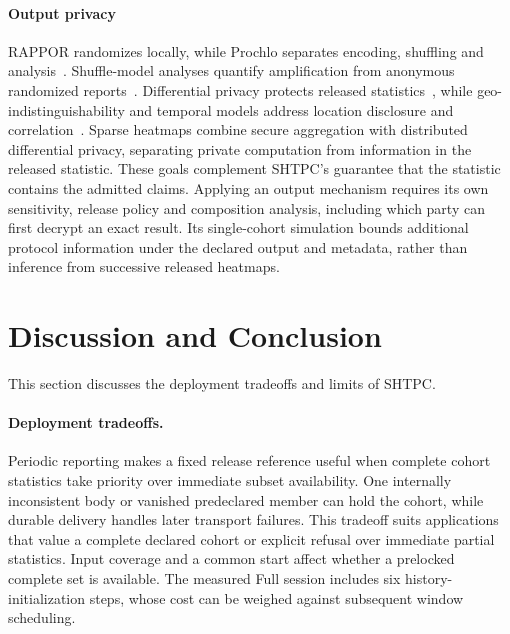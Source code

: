 \documentclass[conference,compsoc]{IEEEtran}
\theoremstyle{definition}
\numberwithin{equation}{section}
\numberwithin{table}{section}
\numberwithin{figure}{section}
\theoremstyle{plain}
\begin{document}
\paragraph{Output privacy}
RAPPOR randomizes locally, while Prochlo separates encoding, shuffling and
analysis~\cite{Erlingsson2014RAPPOR,Bittau2017Prochlo}. Shuffle-model analyses
quantify amplification from anonymous randomized reports~\cite{Cheu2019distributed,Erlingsson2019Amplification,Balle2019privacy}.
Differential privacy protects released statistics~\cite{Dwork2006calibrating,Dwork2014algorithmic},
while geo-indistinguishability and temporal models address location disclosure
and correlation~\cite{Andres2013geoi,Xiao2015Temporal,Montjoye2013Unique}.
Sparse heatmaps combine secure aggregation with distributed differential
privacy, separating private computation from information in the released
statistic. These goals complement SHTPC's guarantee that the statistic contains
the admitted claims. Applying an output mechanism requires its own sensitivity,
release policy and composition analysis, including which party can first
decrypt an exact result. Its single-cohort simulation bounds additional protocol
information under the declared output and metadata, rather than inference
from successive released heatmaps.

\clearpage
\section{Discussion and Conclusion}
\label{sec:limitations}
\label{sec:conclusion}

This section discusses the deployment tradeoffs and limits of SHTPC.

\paragraph{Deployment tradeoffs.}

Periodic reporting makes a fixed release reference useful when complete
cohort statistics take priority over immediate subset availability. One internally inconsistent body or vanished predeclared member
can hold the cohort, while durable delivery handles later transport failures.
This tradeoff suits applications that value a complete declared cohort or
explicit refusal over immediate partial statistics. Input coverage and a common start affect whether a prelocked complete set is available. The measured Full session includes six history-initialization steps, whose cost can be weighed against subsequent window scheduling.
\end{document}
